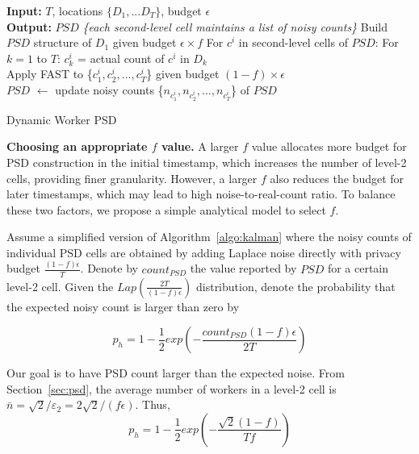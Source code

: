 \documentclass{USC-Thesis}
\numberwithin{equation}{chapter}
\begin{document}
\begin{algorithm}[ht]
\small
\begin{algorithmic}[1]
\STATE \textbf{Input:} $T$, locations $\{D_1,...D_T\}$, budget $\epsilon$\\
\STATE \textbf{Output:} $\mathit{PSD}$ \textit{\{each second-level cell maintains a list of noisy counts\}}
\STATE Build $\mathit{PSD}$ structure of $D_1$ given budget $\epsilon \times f$ \label{line:ag_structure}
\STATE For $c^i$ in second-level cells of $\mathit{PSD}$: \label{line:each_2ndcell}
\STATE \hspace*{4mm} For $k=1$ to $T$:
\STATE \hspace*{8mm} $c_k^i$ = actual count of $c^i$ in $D_k$ \\
\STATE \hspace*{4mm} Apply FAST to \{$c_1^i,c_2^i,...,c_T^i$\} given budget $(1-f) \times \epsilon$ \\ \label{line:apply_fast}
\STATE \hspace*{4mm} $\mathit{PSD}$ $\leftarrow$ update noisy counts \{$n_{c_1^i},n_{c_2^i},...,n_{c_T^i}$\} of $\mathit{PSD}$
\end{algorithmic}
\caption{Dynamic Worker PSD} \label{algo:kalman}
\end{algorithm}

\noindent
\textbf {Choosing an appropriate $f$ value.}
A larger $f$ value allocates more budget for PSD construction in the initial timestamp, which increases the number of level-2 cells, providing finer granularity. However, a larger $f$ also reduces the budget for later timestamps, which may lead to high noise-to-real-count ratio. To balance these two factors, we propose a simple analytical model to select $f$.

Assume a simplified version of Algorithm~\ref{algo:kalman} where the noisy counts of individual PSD cells are obtained by adding Laplace noise directly with privacy budget $\frac{(1-f)\epsilon}{T}$. Denote by $count_{PSD}$ the value reported by $PSD$ for a certain level-2 cell. Given the $Lap(\frac{2T}{(1-f)\epsilon})$ distribution, denote the probability that the expected noisy count is larger than zero by

$$p_h=1-\frac{1}{2}exp(-\frac{count_{PSD}(1-f)\epsilon}{2T})$$

Our goal is to have PSD count larger than the expected noise. From Section~\ref{sec:psd}, the average number of workers in a level-2 cell is $\bar{n}=\sqrt{2}/\varepsilon_2=2\sqrt{2}/(f\epsilon)$. Thus, $$p_h=1-\frac{1}{2}exp(-\frac{\sqrt{2}(1-f)}{Tf})$$
\end{document}
